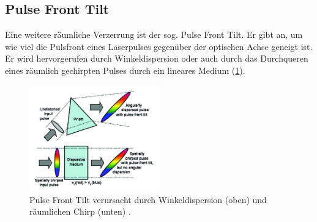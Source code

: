\documentclass[twoside,        %
               BCOR12mm,       %
               english,ngerman, %
               fleqn,headsepline=false,footsepline=false
              ]{Vorlage/MFPREPORT}
\begin{document}
\subsection{Pulse Front Tilt}
Eine weitere räumliche Verzerrung ist der sog. Pulse Front Tilt. Er gibt an, um
wie viel die Pulsfront eines Laserpulses gegenüber der optischen Achse geneigt
ist. Er wird hervorgerufen durch Winkeldispersion oder auch durch das
Durchqueren eines räumlich gechirpten Pulses durch ein lineares Medium
(\cref{fig:pft}).
\begin{figure}[]
    \centering
    \includegraphics[width=0.5\textwidth]{pft.jpeg}
    \caption{Pulse Front Tilt verursacht durch Winkeldispersion (oben) und
        räumlichen Chirp (unten) \cite{Akturk:04}.}
    \label{fig:pft}
\end{figure}
\end{document}
